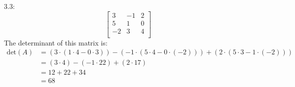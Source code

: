 \documentclass[a4paper,12pt]{article} %
\begin{document}
3.3: \\
\[
\begin{bmatrix}
    3 & -1 & 2 \\
    5 & 1 & 0 \\
    -2 & 3 & 4 \\
\end{bmatrix}
\]
The determinant of this matrix is:
\begin{align*}
\text{det}(A) &= (3 \cdot (1 \cdot 4 - 0 \cdot 3)) - (-1 \cdot (5 \cdot 4 - 0 \cdot (-2))) + (2 \cdot (5 \cdot 3 - 1 \cdot (-2))) \\
&= (3 \cdot 4) - (-1 \cdot 22) + (2 \cdot 17) \\
&= 12 + 22 + 34 \\
&= 68 \\
\end{align*}
\\
\end{document}
